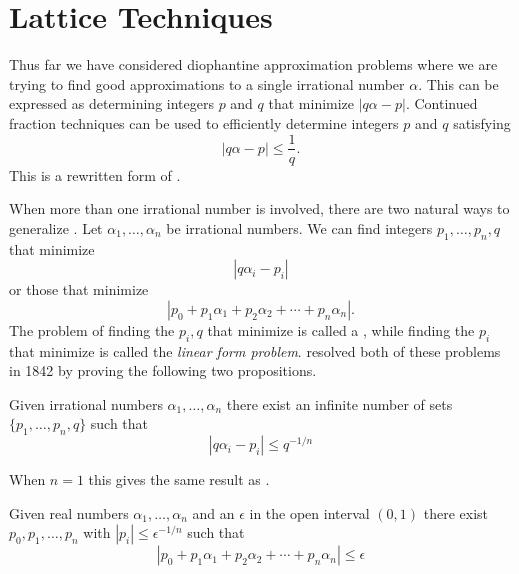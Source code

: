 
\chapter{Lattice Techniques}
\label{Lattice:Chap}

Thus far we have considered diophantine approximation problems where
we are trying to find good approximations to a single irrational
number $\alpha$.  This can be expressed as determining integers $p$
and $q$ that minimize $|q \alpha - p|$.  Continued fraction techniques
can be used to efficiently determine integers $p$ and $q$ satisfying
\begin{equation} \label{1D:Approx:Eq}
\left| q \alpha - p\right| \le \frac{1}{q}.
\end{equation}
This is a rewritten form of .

When more than one irrational number is involved, there are two
natural ways to generalize .  Let $\alpha_1,
\ldots, \alpha_n$ be irrational numbers.  We can find integers $p_{1},
\ldots, p_{n}, q$ that minimize
\begin{equation}
\left| q \alpha_{i} - p_{i} \right|
\label{Simul:Approx:Eq}
\end{equation}
or those that minimize
\begin{equation}
\left|p_0 + p_{1} \alpha_{1} + p_{2} \alpha_{2} + \cdots + p_{n} \alpha_{n} \right|.
\label{Linear:Form:Eq}
\end{equation}
The problem of finding the $p_{i}, q$ that minimize
 is called a , while finding the $p_{i}$ that minimize
 is called the {\em
linear form problem\/}.  {\Dirichlet} resolved both of these problems in
1842 \cite{Dirichlet:Approx} by proving the following two propositions.

\begin{proposition}[{\Dirichlet}] 
\label{Dirichlet:Multiple:Prop}
Given irrational numbers $\alpha_{1}, \ldots, \alpha_{n}$ there exist
an infinite number of sets $\{p_{1}, \ldots, p_{n}, q\}$ such that
\[
\left| q \alpha_{i} - p_{i}\right| \le q^{-1/n}
\]
\end{proposition}

When $n = 1$ this gives the same result as . 

\begin{proposition}[{\Dirichlet}]
\label{Dirichlet:Mutual:Prop}
Given real numbers $\alpha_{1}, \ldots, \alpha_{n}$ and an
$\epsilon$ in the open interval $(0, 1)$ there exist $p_{0}, p_1,
\ldots, p_{n}$ with $\left|p_{i}\right| \le \epsilon^{-1/n}$ such that
\[
\left| p_0 + p_{1} \alpha_{1} + p_{2} \alpha_{2} + \cdots + p_{n} \alpha_{n} \right|
\le \epsilon
\]
\end{proposition}

